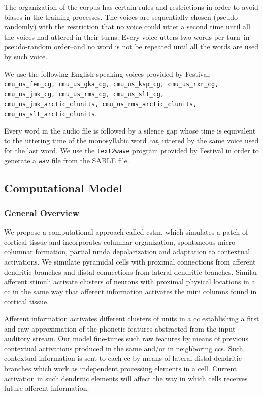 \documentclass[10pt,letterpaper]{article}
\begin{document}
The organization of the corpus has certain rules and restrictions in order to avoid biases in the training processes.
The voices are sequentially chosen (pseudo-randomly) with the restriction that no voice could utter a second time until all the voices had uttered in their turns. Every voice utters two words per turn--in pseudo-random order--and no word is not be repeated until all the words are used by such voice. 

We use the following English speaking voices provided by Festival: \texttt{cmu\_us\_fem\_cg, cmu\_us\_gka\_cg, cmu\_us\_ksp\_cg, cmu\_us\_rxr\_cg, cmu\_us\_jmk\_cg, cmu\_us\_rms\_cg, cmu\_us\_slt\_cg, cmu\_us\_jmk\_arctic\_clunits, cmu\_us\_rms\_arctic\_clunits, cmu\_us\_slt\_arctic\_clunits}.

Every word in the audio file is followed by a silence gap whose time is equivalent to the uttering time of the monosyllabic word \textit{cat}, uttered by the same voice used for the last word. We use the \texttt{text2wave} program provided by Festival in order to generate a \texttt{wav} file from the SABLE file.



\subsection*{Computational Model}

\subsubsection*{General Overview}

We propose a computational approach called \gls{cstm}, which simulates a patch of cortical tissue and incorporates columnar organization, spontaneous micro-columnar formation, partial \gls{nmda} depolarization and adaptation to contextual activations. We simulate pyramidal cells with proximal connections from afferent dendritic branches and distal connections from lateral dendritic branches. Similar afferent stimuli activate clusters of neurons with proximal physical locations in a \gls{cc} in the same way that afferent information activates the mini columns found in cortical tissue.

Afferent information activates different clusters of units in a \gls{cc} establishing a first and raw approximation of the phonetic features abstracted from the input auditory stream. Our model fine-tunes such raw features by means of previous contextual activations produced in the same and/or in neighboring \glspl{cc}. Such contextual information is sent to each \gls{cc} by means of lateral distal dendritic branches which work as independent processing elements in a cell. Current activation in such dendritic elements will affect the way in which cells receives future afferent information.
\end{document}
